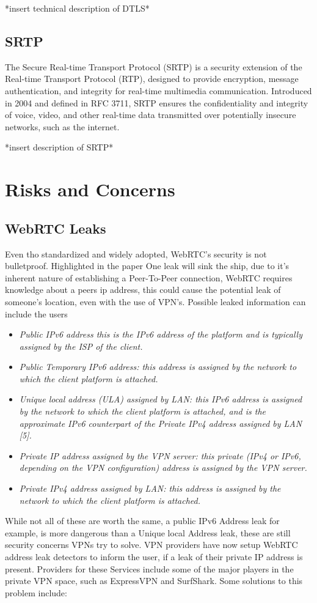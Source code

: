 \documentclass[conference]{IEEEtran}
\begin{document}
*insert technical description of DTLS*

\subsection{SRTP}
The Secure Real-time Transport Protocol (SRTP) is a security extension of the Real-time Transport Protocol (RTP), 
designed to provide encryption, message authentication, and integrity for real-time multimedia communication. 
Introduced in 2004 and defined in RFC 3711, SRTP ensures the confidentiality and integrity of voice, video, and 
other real-time data transmitted over potentially insecure networks, such as the internet. \cite{RFC3711}

*insert description of SRTP*

\section{Risks and Concerns}
\subsection{WebRTC Leaks}
Even tho standardized and widely adopted, WebRTC's security is not bulletproof. 
Highlighted in the paper One leak will sink the ship, due to it's inherent nature 
of establishing a Peer-To-Peer connection, WebRTC requires
knowledge about a peers ip address, this could cause the potential leak of someone's location, even with
the use of VPN's. Possible leaked information can include the users 
\begin{itemize}
    \item \it{Public IPv6 address} this is the IPv6 address of the
    platform and is typically assigned by the ISP of the client.
    \item \it{Public Temporary IPv6 address:} this address is assigned
    by the network to which the client platform is attached.
    \item \it{Unique local address (ULA) assigned by LAN:} this IPv6
    address is assigned by the network to which the client
    platform is attached, and is the approximate IPv6 counterpart of 
    the Private IPv4 address assigned by LAN [5].
    \item \it{Private IP address assigned by the VPN server:} this private 
    (IPv4 or IPv6, depending on the VPN configuration)
    address is assigned by the VPN server.
    \item \it{Private IPv4 address assigned by LAN:} this address is 
    assigned by the network to which the client platform is
    attached.
  \end{itemize}\cite{One_leak_will_sink_a_ship}
While not all of these are worth the same, a public IPv6 Address leak for example, is more dangerous than a
Unique local Address leak, these are still security concerns VPNs try to solve.
VPN providers have now setup WebRTC address leak detectors to inform the user, if a leak of their private IP address
is present. Providers for these Services include some of the major players in the private VPN space, such as 
ExpressVPN and SurfShark. %
Some solutions to this problem include:
\end{document}
